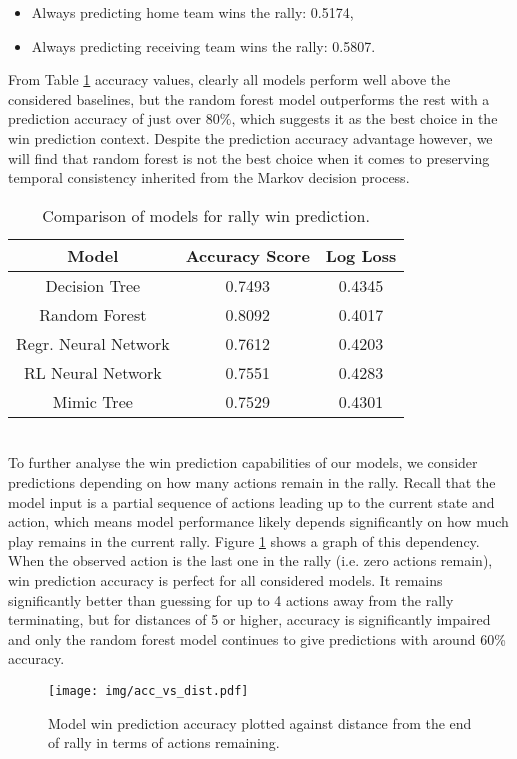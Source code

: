 \documentclass{sfuthesis}
\begin{document}
	\begin{itemize}
		\item Always predicting home team wins the rally: 0.5174,
		\item Always predicting receiving team wins the rally: 0.5807.
	\end{itemize}
	From Table \ref{tab:class_accuracy} accuracy values, clearly all models perform well above the considered baselines, but the random forest model outperforms the rest with a prediction accuracy of just over 80\%, which suggests it as the best choice in the win prediction context. Despite the prediction accuracy advantage however, we will find that random forest is not the best choice when it comes to preserving temporal consistency inherited from the Markov decision process.\\
	\begin{table}
		\centering
		\begin{tabular}{c|cc}
			\textbf{Model} & \textbf{Accuracy Score} & \textbf{Log Loss} \\ \hline
			Decision Tree  & 0.7493                  & 0.4345            \\
			Random Forest  & 0.8092                  & 0.4017            \\
			Regr. Neural Network & 0.7612                  & 0.4203        \\
			RL Neural Network & 0.7551                  & 0.4283            \\
			Mimic Tree     & 0.7529                  & 0.4301           
		\end{tabular}
		\caption{Comparison of models for rally win prediction.}
		\label{tab:class_accuracy}
	\end{table}
	\\To further analyse the win prediction capabilities of our models, we consider predictions depending on how many actions remain in the rally. Recall that the model input is a partial sequence of actions leading up to the current state and action, which means model performance likely depends significantly on how much play remains in the current rally. Figure \ref{fig:acc-vs-dist} shows a graph of this dependency. When the observed action is the last one in the rally (i.e. zero actions remain), win prediction accuracy is perfect for all considered models. It remains significantly better than guessing for up to 4 actions away from the rally terminating, but for distances of 5 or higher, accuracy is significantly impaired and only the random forest model continues to give predictions with around 60\% accuracy.
	\begin{figure}
		\texttt{[image: img/acc\_vs\_dist.pdf]}
		\caption{Model win prediction accuracy plotted against distance from the end of rally in terms of actions remaining.}
		\label{fig:acc-vs-dist}
	\end{figure}
	
\end{document}
